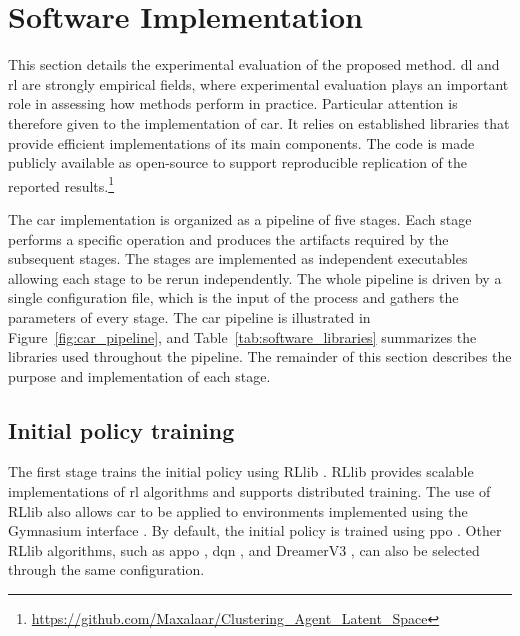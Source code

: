 \section{Software Implementation}
\label{sec:experiments_software}

This section details the experimental evaluation of the proposed method.
\gls{dl} and \gls{rl} are strongly empirical fields, where experimental evaluation plays an important role in assessing how methods perform in practice.
Particular attention is therefore given to the implementation of \gls{car}.
It relies on established libraries that provide efficient implementations of its main components.
The code is made publicly available as open-source to support reproducible replication of the reported results.\footnote{\url{https://github.com/Maxalaar/Clustering_Agent_Latent_Space}}

The \gls{car} implementation is organized as a pipeline of five stages.
Each stage performs a specific operation and produces the artifacts required by the subsequent stages.
The stages are implemented as independent executables allowing each stage to be rerun independently.
The whole pipeline is driven by a single configuration file, which is the input of the process and gathers the parameters of every stage.
The \gls{car} pipeline is illustrated in Figure~\ref{fig:car_pipeline}, and Table~\ref{tab:software_libraries} summarizes the libraries used throughout the pipeline.
The remainder of this section describes the purpose and implementation of each stage.



\FloatBarrier



\subsection{Initial policy training}

The first stage trains the initial policy using RLlib \parencite{moritz2018ray, liang2018rllib}.
RLlib provides scalable implementations of \gls{rl} algorithms and supports distributed training.
The use of RLlib also allows \gls{car} to be applied to environments implemented using the Gymnasium interface \parencite{towers2024gymnasium}.
By default, the initial policy is trained using \gls{ppo} \parencite{schulman2017proximalpolicyoptimizationalgorithms}.
Other RLlib algorithms, such as \gls{appo} \parencite{espeholt2018impala}, \gls{dqn} \parencite{mnih2013playingatarideepreinforcement}, and DreamerV3 \parencite{hafner2023masteringdiversedomainsworld}, can also be selected through the same configuration.

